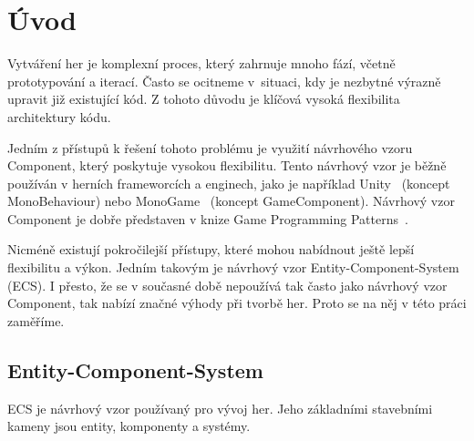 \chapter{Úvod}
Vytváření her je komplexní proces, který zahrnuje mnoho fází, včetně prototypování a iterací. Často se ocitneme v~situaci, kdy je nezbytné výrazně upravit již existující kód. Z tohoto důvodu je klíčová vysoká flexibilita architektury kódu.

Jedním z přístupů k řešení tohoto problému je využití návrhového vzoru Component, který poskytuje vysokou flexibilitu. Tento návrhový vzor je běžně používán v herních frameworcích a enginech, jako je například Unity~\cite{Unity} (koncept MonoBehaviour) nebo MonoGame~\cite{MonoGame} (koncept GameComponent). Návrhový vzor Component je dobře představen v knize Game Programming Patterns~\cite{nystrom2014game}.

Nicméně existují pokročilejší přístupy, které mohou nabídnout ještě lepší flexibilitu a výkon. Jedním takovým je návrhový vzor Entity-Component-System (ECS).  I přesto, že se v současné době nepoužívá tak často jako návrhový vzor Component, tak nabízí značné výhody při tvorbě her. Proto se na něj v této práci zaměříme.

\section{Entity-Component-System}
ECS je návrhový vzor používaný pro vývoj her. Jeho základními stavebními kameny jsou entity, komponenty a systémy.

